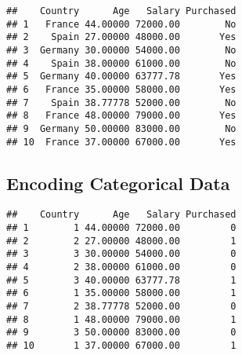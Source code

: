 \documentclass[
]{article}
\newenvironment{Shaded}{\begin{snugshade}}{\end{snugshade}}
\newcommand{\AttributeTok}[1]{\textcolor[rgb]{0.13,0.29,0.53}{#1}}
\newcommand{\DecValTok}[1]{\textcolor[rgb]{0.00,0.00,0.81}{#1}}
\newcommand{\FunctionTok}[1]{\textcolor[rgb]{0.13,0.29,0.53}{\textbf{#1}}}
\newcommand{\NormalTok}[1]{#1}
\newcommand{\OtherTok}[1]{\textcolor[rgb]{0.56,0.35,0.01}{#1}}
\newcommand{\SpecialCharTok}[1]{\textcolor[rgb]{0.81,0.36,0.00}{\textbf{#1}}}
\newcommand{\StringTok}[1]{\textcolor[rgb]{0.31,0.60,0.02}{#1}}
\begin{document}
\begin{verbatim}
##    Country      Age   Salary Purchased
## 1   France 44.00000 72000.00        No
## 2    Spain 27.00000 48000.00       Yes
## 3  Germany 30.00000 54000.00        No
## 4    Spain 38.00000 61000.00        No
## 5  Germany 40.00000 63777.78       Yes
## 6   France 35.00000 58000.00       Yes
## 7    Spain 38.77778 52000.00        No
## 8   France 48.00000 79000.00       Yes
## 9  Germany 50.00000 83000.00        No
## 10  France 37.00000 67000.00       Yes
\end{verbatim}

\hypertarget{encoding-categorical-data}{%
\subsection{Encoding Categorical Data}\label{encoding-categorical-data}}

\begin{Shaded}
\end{Shaded}

\begin{verbatim}
##    Country      Age   Salary Purchased
## 1        1 44.00000 72000.00         0
## 2        2 27.00000 48000.00         1
## 3        3 30.00000 54000.00         0
## 4        2 38.00000 61000.00         0
## 5        3 40.00000 63777.78         1
## 6        1 35.00000 58000.00         1
## 7        2 38.77778 52000.00         0
## 8        1 48.00000 79000.00         1
## 9        3 50.00000 83000.00         0
## 10       1 37.00000 67000.00         1
\end{verbatim}
\end{document}
